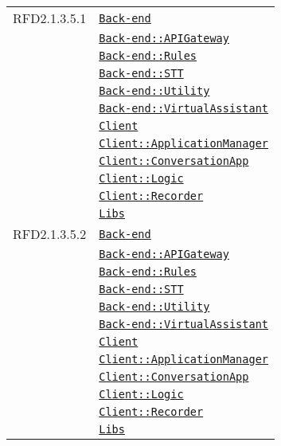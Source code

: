 \begin{longtable}{|>{\centering}m{3cm}|m{10cm}<{\centering}|}
RFD2.1.3.5.1 & \hyperref[Back-end]{\texttt{Back-end}}\\
& \hyperref[Back-end::APIGateway]{\texttt{Back-end::APIGateway}}\\
& \hyperref[Back-end::Rules]{\texttt{Back-end::Rules}}\\
& \hyperref[Back-end::STT]{\texttt{Back-end::STT}}\\
& \hyperref[Back-end::Utility]{\texttt{Back-end::Utility}}\\
& \hyperref[Back-end::VirtualAssistant]{\texttt{Back-end::VirtualAssistant}}\\
& \hyperref[Client]{\texttt{Client}}\\
& \hyperref[Client::ApplicationManager]{\texttt{Client::ApplicationManager}}\\
& \hyperref[Client::ConversationApp]{\texttt{Client::ConversationApp}}\\
& \hyperref[Client::Logic]{\texttt{Client::Logic}}\\
& \hyperref[Client::Recorder]{\texttt{Client::Recorder}}\\
& \hyperref[Libs]{\texttt{Libs}}\\ \hline

RFD2.1.3.5.2 & \hyperref[Back-end]{\texttt{Back-end}}\\
& \hyperref[Back-end::APIGateway]{\texttt{Back-end::APIGateway}}\\
& \hyperref[Back-end::Rules]{\texttt{Back-end::Rules}}\\
& \hyperref[Back-end::STT]{\texttt{Back-end::STT}}\\
& \hyperref[Back-end::Utility]{\texttt{Back-end::Utility}}\\
& \hyperref[Back-end::VirtualAssistant]{\texttt{Back-end::VirtualAssistant}}\\
& \hyperref[Client]{\texttt{Client}}\\
& \hyperref[Client::ApplicationManager]{\texttt{Client::ApplicationManager}}\\
& \hyperref[Client::ConversationApp]{\texttt{Client::ConversationApp}}\\
& \hyperref[Client::Logic]{\texttt{Client::Logic}}\\
& \hyperref[Client::Recorder]{\texttt{Client::Recorder}}\\
& \hyperref[Libs]{\texttt{Libs}}\\ \hline


\end{longtable}
